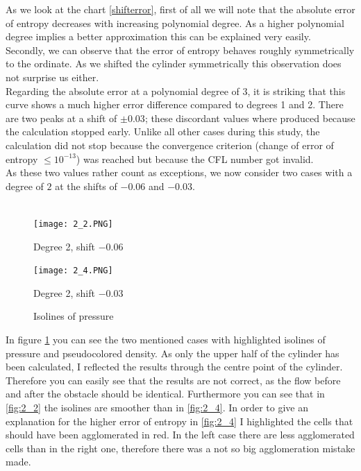 	As we look at the chart \ref{shifterror}, first of all we will note that the absolute error of entropy decreases with increasing polynomial degree. As a higher polynomial degree implies a better approximation this can be explained very easily. \\ \indent
	Secondly, we can observe that the error of entropy behaves roughly symmetrically to the ordinate. As we shifted the cylinder symmetrically this observation does not surprise us either. \\ \indent
	Regarding the absolute error at a polynomial degree of 3, it is striking that this curve shows a much higher error difference compared to degrees 1 and 2. There are two peaks at a shift of $\pm 0.03$; these discordant values where produced because the calculation stopped early. Unlike all other cases during this study, the calculation did not stop because the convergence criterion (change of error of entropy $\leq 10^{-13}$) was reached but because the CFL number got invalid.\\ \indent
	As these two values rather count as exceptions, we now consider two cases with a degree of $2$ at the shifts of $-0.06$ and $-0.03$. \\\\
	
	\begin{figure}[htp]
		\centering
		\begin{minipage}[b]{0.5\textwidth}
			\centering
			\texttt{[image: 2\_2.PNG]}
			\caption{Degree 2, shift $-0.06$}
			\label{fig:2_2}
		\end{minipage}%
		\begin{minipage}[b]{0.5\textwidth}
			\centering
			\texttt{[image: 2\_4.PNG]}
			\caption{Degree 2, shift $-0.03$}
			\label{fig:2_4}
		\end{minipage}
		\caption{Isolines of pressure}\label{fig:isoshift}
	\end{figure}
	
	In figure \ref{fig:isoshift} you can see the two mentioned cases with highlighted isolines of pressure and pseudocolored density. As only the upper half of the cylinder has been calculated, I reflected the results through the centre point of the cylinder. Therefore you can easily see that the results are not correct, as the flow before and after the obstacle should be identical. Furthermore you can see that in \ref{fig:2_2} the isolines are smoother than in \ref{fig:2_4}. In order to give an explanation for the higher error of entropy in \ref{fig:2_4} I highlighted the cells that should have been agglomerated in red. In the left case there are less agglomerated cells than in the right one, therefore there was a not so big agglomeration mistake made.\\\\
	
